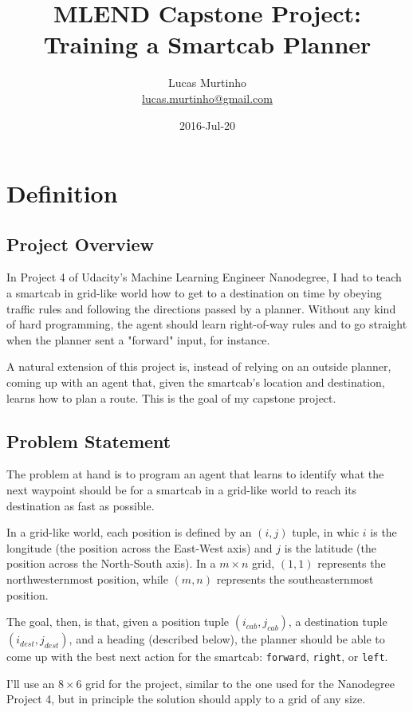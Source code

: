 \documentclass{article}
\title{MLEND Capstone Project: Training a Smartcab Planner}
\author{Lucas Murtinho \\ \url{lucas.murtinho@gmail.com}}
\date{2016-Jul-20}
\begin{document}
\maketitle
\tableofcontents
\newpage

\section{Definition}


\subsection{Project Overview}

In Project 4 of Udacity's Machine Learning Engineer Nanodegree, I had to teach a smartcab in grid-like world how to get to a destination on time by obeying traffic rules and following the directions passed by a planner. Without any kind of hard programming, the agent should learn right-of-way rules and to go straight when the planner sent a "forward" input, for instance.

A natural extension of this project is, instead of relying on an outside planner, coming up with an agent that, given the smartcab's location and destination, learns how to plan a route. This is the goal of my capstone project.


\subsection{Problem Statement}

The problem at hand is to program an agent that learns to identify what the next waypoint should be for a smartcab in a grid-like world to reach its destination as fast as possible.

In a grid-like world, each position is defined by an $(i, j)$ tuple, in whic $i$ is the longitude (the position across the East-West axis) and $j$ is the latitude (the position across the North-South axis). In a $m\times n$ grid, $(1, 1)$ represents the northwesternmost position, while $(m, n)$ represents the southeasternmost position.

The goal, then, is that, given a position tuple $(i_{cab}, j_{cab})$, a destination tuple $(i_{dest}, j_{dest})$, and a heading (described below), the planner should be able to come up with the best next action for the smartcab: \texttt{forward}, \texttt{right}, or \texttt{left}. 

I'll use an $8\times6$ grid for the project, similar to the one used for the Nanodegree Project 4, but in principle the solution should apply to a grid of any size.
\end{document}
